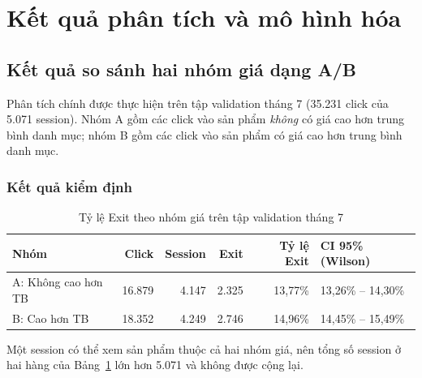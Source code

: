 
\section{Kết quả phân tích và mô hình hóa}
\label{sec:results}

\subsection{Kết quả so sánh hai nhóm giá dạng A/B}
\label{subsec:ab}

Phân tích chính được thực hiện trên tập validation tháng 7 (35.231 click của
5.071 session). Nhóm A gồm các click vào sản phẩm \emph{không} có giá cao hơn
trung bình danh mục; nhóm B gồm các click vào sản phẩm có giá cao hơn trung bình
danh mục.

\subsubsection{Kết quả kiểm định}

\begin{table}[H]
\centering
\caption{Tỷ lệ Exit theo nhóm giá trên tập validation tháng 7}
\label{tab:ab-rate}
\small
\begin{tabular}{lrrrrl}
\toprule
\textbf{Nhóm} & \textbf{Click} & \textbf{Session} & \textbf{Exit}
& \textbf{Tỷ lệ Exit} & \textbf{CI 95\% (Wilson)} \\
\midrule
A: Không cao hơn TB & 16.879 & 4.147 & 2.325 & 13,77\% & 13,26\% -- 14,30\% \\
B: Cao hơn TB       & 18.352 & 4.249 & 2.746 & 14,96\% & 14,45\% -- 15,49\% \\
\bottomrule
\end{tabular}
\end{table}

Một session có thể xem sản phẩm thuộc cả hai nhóm giá, nên tổng số session ở hai
hàng của Bảng~\ref{tab:ab-rate} lớn hơn 5.071 và không được cộng lại.

